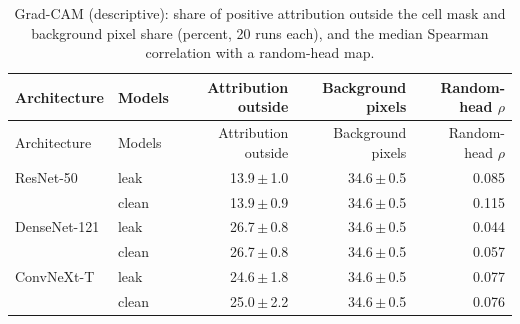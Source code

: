 {\footnotesize
\setlength{\tabcolsep}{3.5pt}
\begin{longtable}{llrrr}
\caption{Grad-CAM (descriptive): share of positive attribution outside the cell mask and background pixel share (percent, 20 runs each), and the median Spearman correlation with a random-head map.}\label{r:tab:gradcam}\\
\toprule
Architecture & Models & Attribution outside & Background pixels & Random-head $\rho$ \\
\midrule
\endfirsthead
\toprule
Architecture & Models & Attribution outside & Background pixels & Random-head $\rho$ \\
\midrule
\endhead
\bottomrule
\endfoot
ResNet-50 & leak & 13.9\,$\pm$\,1.0 & 34.6\,$\pm$\,0.5 & 0.085 \\
 & clean & 13.9\,$\pm$\,0.9 & 34.6\,$\pm$\,0.5 & 0.115 \\
DenseNet-121 & leak & 26.7\,$\pm$\,0.8 & 34.6\,$\pm$\,0.5 & 0.044 \\
 & clean & 26.7\,$\pm$\,0.8 & 34.6\,$\pm$\,0.5 & 0.057 \\
ConvNeXt-T & leak & 24.6\,$\pm$\,1.8 & 34.6\,$\pm$\,0.5 & 0.077 \\
 & clean & 25.0\,$\pm$\,2.2 & 34.6\,$\pm$\,0.5 & 0.076 \\
\end{longtable}
}
